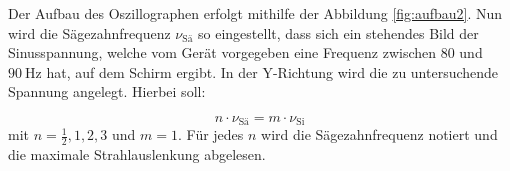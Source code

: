 Der Aufbau des Oszillographen erfolgt mithilfe der Abbildung \ref{fig:aufbau2}. Nun wird die Sägezahnfrequenz $\nu_{\text{Sä}}$ so eingestellt, dass sich ein stehendes Bild der Sinusspannung, welche vom Gerät vorgegeben eine 
Frequenz zwischen $80$ und $\SI{90}{\Hz}$ hat, auf dem Schirm ergibt. In der Y-Richtung wird die zu untersuchende Spannung angelegt. Hierbei soll:

\begin{equation}
n \cdot \nu_{\text{Sä}} = m \cdot \nu_{\text{Si}}
\end{equation}
mit $n = \frac{1}{2}, 1, 2, 3$ und $m = 1$. Für jedes $n$ wird die Sägezahnfrequenz notiert und die maximale Strahlauslenkung abgelesen. 